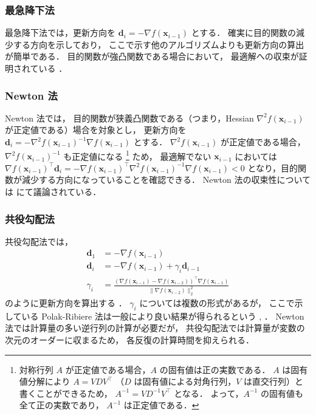 \subsubsection{最急降下法}

最急降下法では，更新方向を $\bm{d}_i = -\nabla f(\bm{x}_{i-1})$ とする．
確実に目的関数の減少する方向を示しており，
ここで示す他のアルゴリズムよりも更新方向の算出が簡単である．
目的関数が強凸関数である場合において，
最適解への収束が証明されている
\cite[Section 9.3.1]{Boyd2004}．

\subsubsection{Newton 法}

Newton 法では，
目的関数が狭義凸関数である（つまり，Hessian $\nabla^2 f(\bm{x}_{i-1})$ が正定値である）場合を対象とし，
更新方向を
$\bm{d}_i = -\nabla^2 f(\bm{x}_{i-1})^{-1} \nabla f(\bm{x}_{i-1})$
とする．
$\nabla^2 f(\bm{x}_{i-1})$ が正定値である場合，
$\nabla^2 f(\bm{x}_{i-1})^{-1}$ も正定値になる
\footnote{%
対称行列 $A$ が正定値である場合，$A$ の固有値は正の実数である．%
$A$ は固有値分解により $A=VDV^\top$ （$D$ は固有値による対角行列，$V$ は直交行列）と書くことができるため，%
$A^{-1} = VD^{-1}V^\top$ となる．%
よって，$A^{-1}$ の固有値も全て正の実数であり，%
$A^{-1}$ は正定値である．%
}
ため，
最適解でない $\bm{x}_{i-1}$ においては
$\nabla f(\bm{x}_{i-1})^\top \bm{d}_i = -\nabla f(\bm{x}_{i-1})^\top \nabla^2 f(\bm{x}_{i-1})^{-1} \nabla f(\bm{x}_{i-1}) < 0$
となり，目的関数が減少する方向になっていることを確認できる．
Newton 法の収束性については \cite[Section 9.5.3, 9.6.4]{Boyd2004} にて議論されている．

\subsubsection{共役勾配法}

共役勾配法では，
\begin{align}
    \bm{d}_1 &= -\nabla f(\bm{x}_{i-1}) \\
    \bm{d}_i &= -\nabla f(\bm{x}_{i-1}) + \gamma_i \bm{d}_{i-1} \\
    \gamma_i &= 
        \frac{(\nabla f(\bm{x}_{i-1}) - \nabla f(\bm{x}_{i-2}))^\top \nabla f(\bm{x}_{i-1})}
        {\|\nabla f(\bm{x}_{i-2})\|_2^2}
\end{align}
のように更新方向を算出する
\cite[Section 8.6]{Luenberger2003}．
$\gamma_i$ については複数の形式があるが，
ここで示している Polak-Ribiere 法は一般により良い結果が得られるという
\cite[Section 8.6]{Luenberger2003}, \cite[Section 10.8]{Press2007}．
Newton 法では計算量の多い逆行列の計算が必要だが，
共役勾配法では計算量が変数の次元のオーダーに収まるため，
各反復の計算時間を抑えられる．
